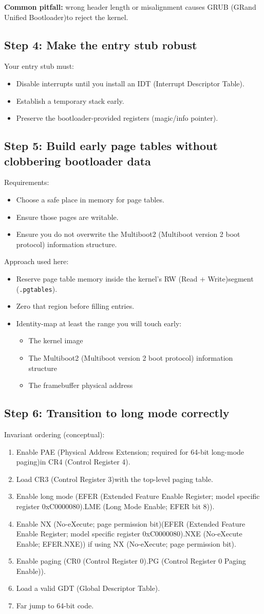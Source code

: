 \documentclass[11pt]{article}
\newcommand{\CRzero}{CR0 (Control Register 0)}
\newcommand{\CRthree}{CR3 (Control Register 3)}
\newcommand{\CRfour}{CR4 (Control Register 4)}
\newcommand{\EFER}{EFER (Extended Feature Enable Register; model specific register 0xC0000080)}
\newcommand{\GDT}{GDT (Global Descriptor Table)}
\newcommand{\GRUB}{GRUB (GRand Unified Bootloader)}
\newcommand{\IDT}{IDT (Interrupt Descriptor Table)}
\newcommand{\LME}{LME (Long Mode Enable; EFER bit 8)}
\newcommand{\MBtwoInfo}{Multiboot2 (Multiboot version 2 boot protocol) information structure}
\newcommand{\NX}{NX (No-eXecute; page permission bit)}
\newcommand{\NXE}{NXE (No-eXecute Enable; EFER.NXE)}
\newcommand{\PAE}{PAE (Physical Address Extension; required for 64-bit long-mode paging)}
\newcommand{\RW}{RW (Read + Write)}
\begin{document}
\textbf{Common pitfall:} wrong header length or misalignment causes \GRUB to reject the kernel.

\subsection{Step 4: Make the entry stub robust}
Your entry stub must:
\begin{itemize}
  \item Disable interrupts until you install an \IDT.
  \item Establish a temporary stack early.
  \item Preserve the bootloader-provided registers (magic/info pointer).
\end{itemize}

\subsection{Step 5: Build early page tables without clobbering bootloader data}
Requirements:
\begin{itemize}
  \item Choose a safe place in memory for page tables.
  \item Ensure those pages are writable.
  \item Ensure you do not overwrite the \MBtwoInfo.
\end{itemize}

Approach used here:
\begin{itemize}
  \item Reserve page table memory inside the kernel’s \RW segment (\texttt{.pgtables}).
  \item Zero that region before filling entries.
  \item Identity-map at least the range you will touch early:
  \begin{itemize}
    \item The kernel image
    \item The \MBtwoInfo
    \item The framebuffer physical address
  \end{itemize}
\end{itemize}

\subsection{Step 6: Transition to long mode correctly}
Invariant ordering (conceptual):
\begin{enumerate}
  \item Enable \PAE in \CRfour.
  \item Load \CRthree with the top-level paging table.
  \item Enable long mode (\EFER.\LME).
  \item Enable \NX (\EFER.\NXE) if using \NX.
  \item Enable paging (\CRzero.PG (Control Register 0 Paging Enable)).
  \item Load a valid \GDT.
  \item Far jump to 64-bit code.
\end{enumerate}
\end{document}
